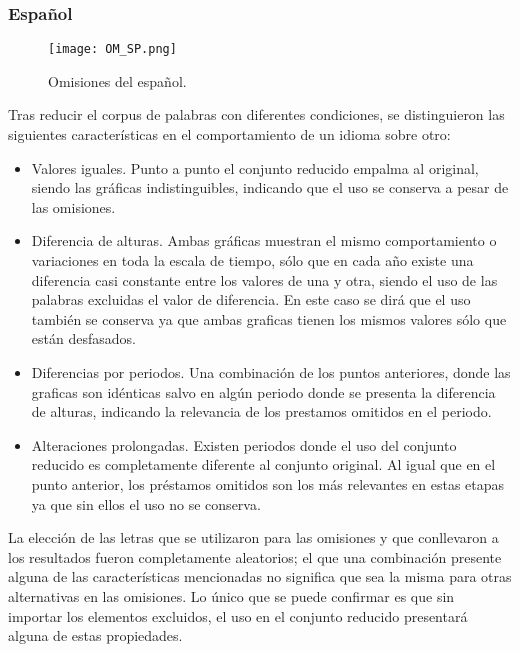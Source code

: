 \newpage
\subsubsection*{Español}

\begin{figure}[h!]
	\centering
	\texttt{[image: OM\_SP.png]}
	\label{fig.OM_SP}
	\caption{Omisiones del español.}
\end{figure}


Tras reducir el corpus de palabras con diferentes condiciones, se distinguieron las siguientes características en el comportamiento de un idioma sobre otro:


\begin{itemize}
	
	\item Valores iguales. Punto a punto el conjunto reducido empalma al original, siendo las gráficas indistinguibles, indicando que el uso se conserva a pesar de las omisiones. 
		
	\item Diferencia de alturas. Ambas gráficas muestran el mismo comportamiento o variaciones en toda la escala de tiempo,  sólo que  en cada año existe una diferencia casi constante entre los valores de una y otra, siendo el uso de las palabras excluidas el valor de diferencia.  En este caso se dirá que el uso también se conserva ya que ambas graficas tienen los mismos valores sólo que están desfasados. 
	
	\item Diferencias por periodos. Una combinación de los puntos anteriores,  donde las graficas son idénticas salvo en algún periodo donde se presenta la diferencia de alturas, indicando la relevancia de los prestamos omitidos en el periodo. 
	
	\item Alteraciones prolongadas. Existen periodos donde el uso del conjunto reducido es completamente diferente al conjunto original. Al igual que en el punto anterior, los préstamos omitidos son los más relevantes en estas etapas ya que sin ellos el uso no se conserva.
			
\end{itemize}


La elección de las letras que se utilizaron para las omisiones y que conllevaron a los resultados fueron completamente aleatorios;  el que una combinación presente alguna de las características mencionadas no significa que sea la misma para otras alternativas en las omisiones. Lo único que se puede confirmar es que sin importar los elementos excluidos, el uso en el conjunto reducido presentará alguna de estas propiedades. 

